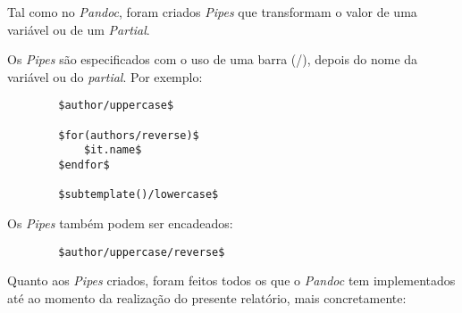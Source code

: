 \documentclass[../relatorio.tex]{subfiles}
\begin{document}
    Tal como no \textit{Pandoc}, foram criados \textit{Pipes}
    que transformam o valor de uma variável ou de um \textit{Partial}.

    Os \textit{Pipes} são especificados com o uso de uma barra (/), 
    depois do nome da variável ou do \textit{partial}. Por exemplo:

    \begin{verbatim}
        $author/uppercase$

        $for(authors/reverse)$
            $it.name$
        $endfor$

        $subtemplate()/lowercase$
    \end{verbatim}

    Os \textit{Pipes} também podem ser encadeados:
    \begin{verbatim}
        $author/uppercase/reverse$
    \end{verbatim}
    
    Quanto aos \textit{Pipes} criados, foram feitos todos os que o
    \textit{Pandoc} tem implementados até ao momento da realização
    do presente relatório, mais concretamente:
\end{document}
